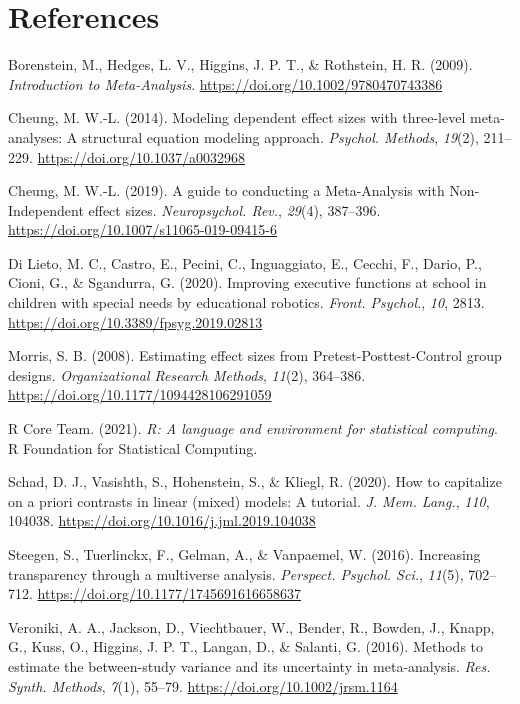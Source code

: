\documentclass[
]{article}
\newlength{\cslhangindent}
\newlength{\cslentryspacingunit} %
\newenvironment{CSLReferences}[2] %
 {%
  \setlength{\parindent}{0pt}
  \ifodd #1
  \let\oldpar\par
  \def\par{\hangindent=\cslhangindent\oldpar}
  \fi
  \setlength{\parskip}{#2\cslentryspacingunit}
 }%
 {}
\begin{document}
\hypertarget{references}{%
\section*{References}\label{references}}

\hypertarget{refs}{}
\begin{CSLReferences}{1}{0}
\leavevmode{}%
Borenstein, M., Hedges, L. V., Higgins, J. P. T., \& Rothstein, H. R. (2009). \emph{Introduction to {Meta-Analysis}}. \url{https://doi.org/10.1002/9780470743386}

\leavevmode{}%
Cheung, M. W.-L. (2014). Modeling dependent effect sizes with three-level meta-analyses: A structural equation modeling approach. \emph{Psychol. Methods}, \emph{19}(2), 211--229. \url{https://doi.org/10.1037/a0032968}

\leavevmode{}%
Cheung, M. W.-L. (2019). A guide to conducting a {Meta-Analysis} with {Non-Independent} effect sizes. \emph{Neuropsychol. Rev.}, \emph{29}(4), 387--396. \url{https://doi.org/10.1007/s11065-019-09415-6}

\leavevmode{}%
Di Lieto, M. C., Castro, E., Pecini, C., Inguaggiato, E., Cecchi, F., Dario, P., Cioni, G., \& Sgandurra, G. (2020). Improving executive functions at school in children with special needs by educational robotics. \emph{Front. Psychol.}, \emph{10}, 2813. \url{https://doi.org/10.3389/fpsyg.2019.02813}

\leavevmode{}%
Morris, S. B. (2008). Estimating effect sizes from {Pretest-Posttest-Control} group designs. \emph{Organizational Research Methods}, \emph{11}(2), 364--386. \url{https://doi.org/10.1177/1094428106291059}

\leavevmode{}%
R Core Team. (2021). \emph{R: A language and environment for statistical computing}. R Foundation for Statistical Computing.

\leavevmode{}%
Schad, D. J., Vasishth, S., Hohenstein, S., \& Kliegl, R. (2020). How to capitalize on a priori contrasts in linear (mixed) models: A tutorial. \emph{J. Mem. Lang.}, \emph{110}, 104038. \url{https://doi.org/10.1016/j.jml.2019.104038}

\leavevmode{}%
Steegen, S., Tuerlinckx, F., Gelman, A., \& Vanpaemel, W. (2016). Increasing transparency through a multiverse analysis. \emph{Perspect. Psychol. Sci.}, \emph{11}(5), 702--712. \url{https://doi.org/10.1177/1745691616658637}

\leavevmode{}%
Veroniki, A. A., Jackson, D., Viechtbauer, W., Bender, R., Bowden, J., Knapp, G., Kuss, O., Higgins, J. P. T., Langan, D., \& Salanti, G. (2016). Methods to estimate the between-study variance and its uncertainty in meta-analysis. \emph{Res. Synth. Methods}, \emph{7}(1), 55--79. \url{https://doi.org/10.1002/jrsm.1164}

\end{CSLReferences}
\end{document}

